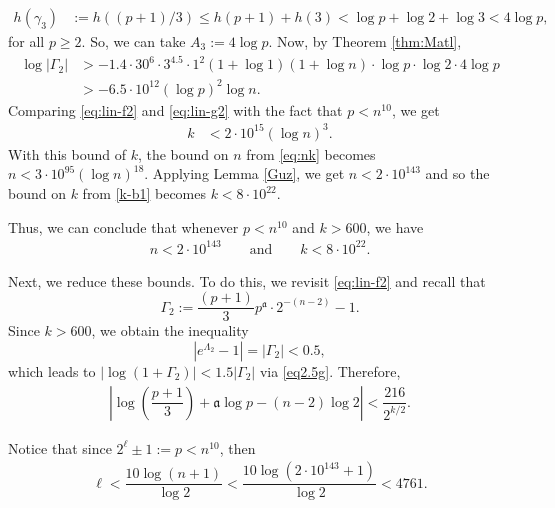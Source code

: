 \documentclass[11pt,a4paper]{article}
\numberwithin{equation}{section}
\numberwithin{table}{section}
\numberwithin{figure}{section}
\begin{document}
\begin{enumerate}[(a)]
\begin{align*}
	h(\gamma_{3})&:=h\left((p+1)/3\right)
	\le h(p+1)+ h\left(3\right)
	< \log p +\log 2+\log 3<4\log p,
\end{align*}
for all $p\ge 2$. So, we can take $A_3:=4\log p$. Now, by Theorem \ref{thm:Matl},
\begin{align}\label{eq:lin-g2}
	\log |\Gamma_2| &> -1.4\cdot 30^{6} \cdot 3^{4.5}\cdot 1^2 (1+\log 1)(1+\log n)\cdot \log p\cdot \log 2 \cdot 4\log p\nonumber\\
	&> - 6.5\cdot 10^{12} (\log p)^2\log n.
\end{align}
Comparing \eqref{eq:lin-f2} and \eqref{eq:lin-g2} with the fact that $p<n^{10}$, we get
\begin{align}\label{k-b1}
	k&<2\cdot 10^{15}(\log n)^3.
\end{align}	
With this bound of $k$, the bound on $n$ from \eqref{eq:nk} becomes $n<3\cdot 10^{95}(\log n)^{18}$. Applying Lemma \ref{Guz}, we get $n<2\cdot 10^{143}$ and so the bound on $k$ from \eqref{k-b1} becomes $k<8\cdot 10^{22}$. 

\medskip

Thus, we can conclude that whenever $p<n^{10}$ and $k>600$, we have 
\begin{align*}
	n<2\cdot 10^{143}\qquad\text{and} \qquad k<8\cdot 10^{22}.
\end{align*}

Next, we reduce these bounds. To do this, we revisit \eqref{eq:lin-f2} and recall that
	\[
	\Gamma_2 := \dfrac{(p+1)}{3}p^\mathfrak{a}\cdot 2^{-(n-2)}-1.
	\]
	Since $k> 600$, we obtain the inequality  
	\[
	\left| e^{\Lambda_2} - 1 \right| = |\Gamma_2| < 0.5,
	\]
	which leads to $ |\log (1+\Gamma_2)| < 1.5|\Gamma_2|$ via \eqref{eq2.5g}. Therefore,
	\begin{align}\label{eq:gf3}
	\left|  \log \left(\dfrac{p+1}{3}\right) + \mathfrak{a} \log p -(n-2) \log 2  \right| < \dfrac{216}{2^{k/2}}.
\end{align}

Notice that since $2^\ell \pm 1:= p<n^{10}$, then
\begin{align*}
	\ell < \dfrac{10\log (n+1)}{\log 2} < \dfrac{10\log (2\cdot 10^{143}+1)}{\log 2} <4761.
\end{align*}


\end{enumerate}
\end{document}
